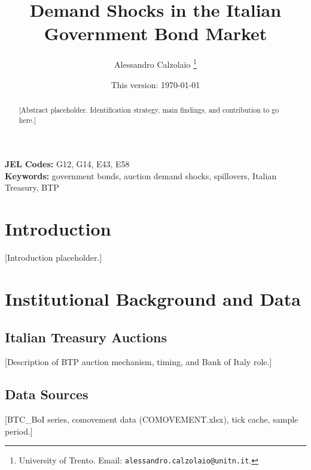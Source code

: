 \documentclass[12pt]{article}
\title{Demand Shocks in the Italian Government Bond Market}
\author{Alessandro Calzolaio%
  \thanks{University of Trento.
    Email: \texttt{alessandro.calzolaio@unitn.it}.}
}
\date{This version: \today}
\begin{document}

\maketitle

\begin{abstract}
[Abstract placeholder. Identification strategy, main findings, and contribution
to go here.]
\end{abstract}

\vspace{1em}
\noindent\textbf{JEL Codes:} G12, G14, E43, E58 \\
\noindent\textbf{Keywords:} government bonds, auction demand shocks,
spillovers, Italian Treasury, BTP

\clearpage

\section{Introduction}
\label{sec:intro}

[Introduction placeholder.]


\section{Institutional Background and Data}
\label{sec:data}

\subsection{Italian Treasury Auctions}

[Description of BTP auction mechanism, timing, and Bank of Italy role.]

\subsection{Data Sources}

[BTC\_BoI series, comovement data (COMOVEMENT.xlsx), tick cache, sample period.]
\end{document}
